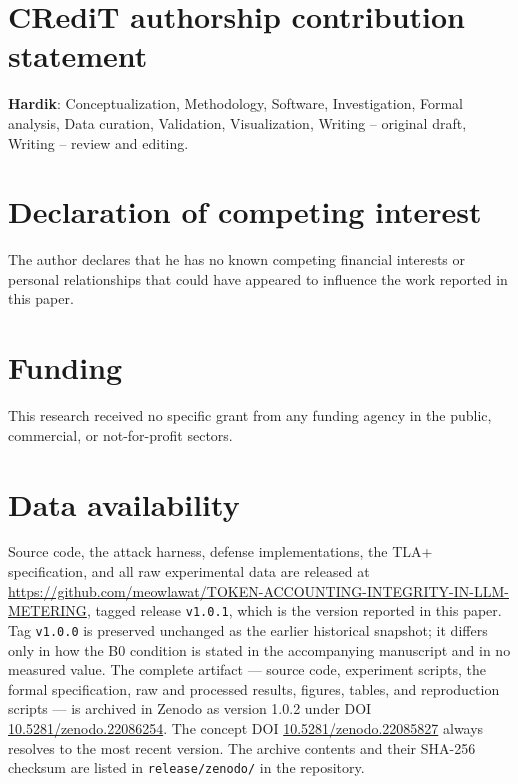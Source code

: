 \documentclass[preprint,3p,authoryear,12pt]{elsarticle}
\begin{document}
\section*{CRediT authorship contribution statement}
\textbf{Hardik}: Conceptualization, Methodology, Software, Investigation, Formal
analysis, Data curation, Validation, Visualization, Writing -- original draft, Writing --
review and editing.

\section*{Declaration of competing interest}
The author declares that he has no known competing financial interests or personal
relationships that could have appeared to influence the work reported in this paper.

\section*{Funding}
This research received no specific grant from any funding agency in the public,
commercial, or not-for-profit sectors.

\section*{Data availability}
Source code, the attack harness, defense implementations, the TLA+ specification, and all
raw experimental data are released at
\url{https://github.com/meowlawat/TOKEN-ACCOUNTING-INTEGRITY-IN-LLM-METERING}, tagged
release \texttt{v1.0.1}, which is the version reported in this paper. Tag
\texttt{v1.0.0} is preserved unchanged as the earlier historical snapshot; it differs only
in how the B0 condition is stated in the accompanying manuscript and in no measured value.
The complete artifact --- source code, experiment scripts, the formal
specification, raw and processed results, figures, tables, and reproduction scripts ---
is archived in Zenodo as version 1.0.2 under DOI
\href{https://doi.org/10.5281/zenodo.22086254}{10.5281/zenodo.22086254}. The concept DOI
\href{https://doi.org/10.5281/zenodo.22085827}{10.5281/zenodo.22085827} always resolves to the
most recent version. The archive contents and their SHA-256 checksum are listed in
\texttt{release/zenodo/} in the repository.
\end{document}
